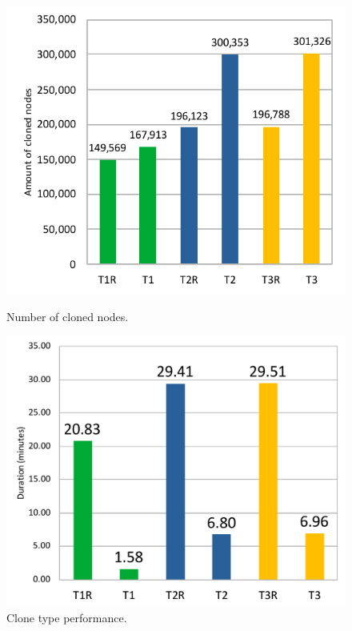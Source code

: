\begin{figure}[H]
  \centering
  \begin{minipage}[b]{0.45\textwidth}
    \includegraphics[width=\textwidth]{img/TypeResults}
    \caption{Number of cloned nodes.}
\label{fig:typeres}
  \end{minipage}
  \hfill
  \begin{minipage}[b]{0.45\textwidth}
    \includegraphics[width=\textwidth]{img/DurationChart}
    \caption{Clone type performance.}
  \label{fig:performance}
  \end{minipage}
\end{figure}

